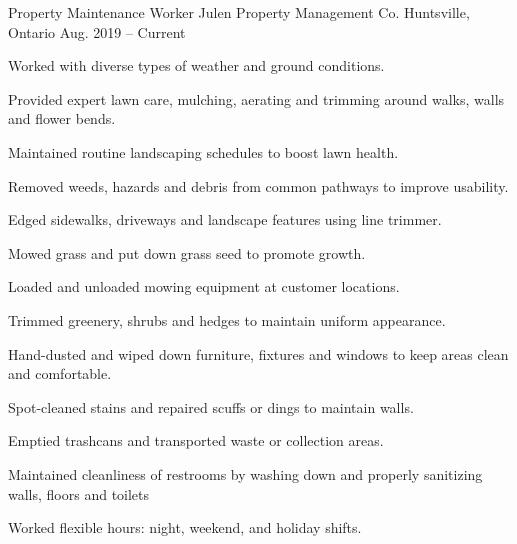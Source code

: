 

\begin{cventries}

  \cventry
    {Property Maintenance Worker} %
    {Julen Property Management Co.} %
    {Huntsville, Ontario} %
    {Aug. 2019 -- Current} %
    {
      \begin{cvitems} %
        \item {Worked with diverse types of weather and ground conditions.}
        \item {Provided expert lawn care, mulching, aerating and trimming around walks, walls and flower bends.}
        \item {Maintained routine landscaping schedules to boost lawn health.}
        \item {Removed weeds, hazards and debris from common pathways to improve usability.}
        \item{Edged sidewalks, driveways and landscape features using line trimmer.}
        \item{Mowed grass and put down grass seed to promote growth.}
        \item{Loaded and unloaded mowing equipment at customer locations.}
        \item{Trimmed greenery, shrubs and hedges to maintain uniform appearance.}
        \item{Hand-dusted and wiped down furniture, fixtures and windows to keep areas clean and comfortable.}
        \item{Spot-cleaned stains and repaired scuffs or dings to maintain walls.}
        \item{Emptied trashcans and transported waste or collection areas.}
        \item {Maintained cleanliness of restrooms by washing down and properly sanitizing walls, floors and toilets}
        \item{Worked flexible hours: night, weekend, and holiday shifts.}
      \end{cvitems}
    }


\end{cventries}
